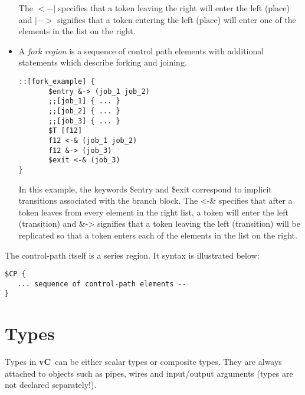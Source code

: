 \documentclass{article}
\newcommand{\vC}{{\bf vC}~}
\begin{document}
\begin{itemize}
The $<-|$ specifies that a token leaving the right will enter
the left (place) and $|->$ signifies that a token entering the left
(place) will enter one of the elements in the list on the right.
\item A {\em fork region} is a sequence of control path
elements with additional statements which describe 
forking and joining.
\begin{verbatim}
::[fork_example] {
       $entry &-> (job_1 job_2)
       ;;[job_1] { ... }
       ;;[job_2] { ... }
       ;;[job_3] { ... }
       $T [f12]
       f12 <-& (job_1 job_2)
       f12 &-> (job_3)
       $exit <-& (job_3)
}
\end{verbatim}
In this example, the keywords \$entry and \$exit correspond
to implicit transitions associated with the branch block.
The <-\& specifies that after a token leaves from every
element in the right list, a token will enter
the left (transition) and \&-> signifies that a token leaving the left
(transition) will be replicated so that a
token enters each of the elements in the list on the right.
\end{itemize}

The control-path itself is a series region. It syntax is
illustrated below:
\begin{verbatim}
$CP {
   ... sequence of control-path elements --
}
\end{verbatim}

\section{Types} \label{sec:Types}

Types in \vC can be either scalar types or composite types.  They
are always attached to objects such as pipes, wires and input/output
arguments (types are not declared separately!).
\end{document}
